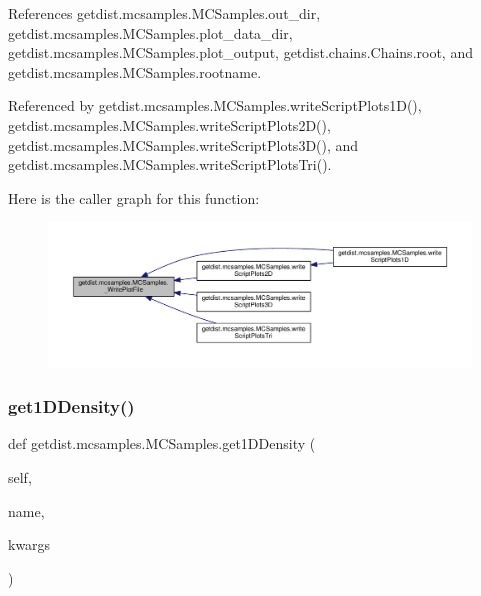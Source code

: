 References getdist.\+mcsamples.\+M\+C\+Samples.\+out\+\_\+dir, getdist.\+mcsamples.\+M\+C\+Samples.\+plot\+\_\+data\+\_\+dir, getdist.\+mcsamples.\+M\+C\+Samples.\+plot\+\_\+output, getdist.\+chains.\+Chains.\+root, and getdist.\+mcsamples.\+M\+C\+Samples.\+rootname.



Referenced by getdist.\+mcsamples.\+M\+C\+Samples.\+write\+Script\+Plots1\+D(), getdist.\+mcsamples.\+M\+C\+Samples.\+write\+Script\+Plots2\+D(), getdist.\+mcsamples.\+M\+C\+Samples.\+write\+Script\+Plots3\+D(), and getdist.\+mcsamples.\+M\+C\+Samples.\+write\+Script\+Plots\+Tri().

Here is the caller graph for this function\+:
\nopagebreak
\begin{figure}[H]
\begin{center}
\leavevmode
\includegraphics[width=350pt]{classgetdist_1_1mcsamples_1_1MCSamples_a7ce3493951d42ba01b959cf3b22b4004_icgraph}
\end{center}
\end{figure}
\mbox{\label{classgetdist_1_1mcsamples_1_1MCSamples_a67d8f66e8c759cac71fc3c0562faa74d}} 
\subsubsection{\texorpdfstring{get1\+D\+Density()}{get1DDensity()}}
{\footnotesize\ttfamily def getdist.\+mcsamples.\+M\+C\+Samples.\+get1\+D\+Density (\begin{DoxyParamCaption}\item[{}]{self,  }\item[{}]{name,  }\item[{}]{kwargs }\end{DoxyParamCaption})}

